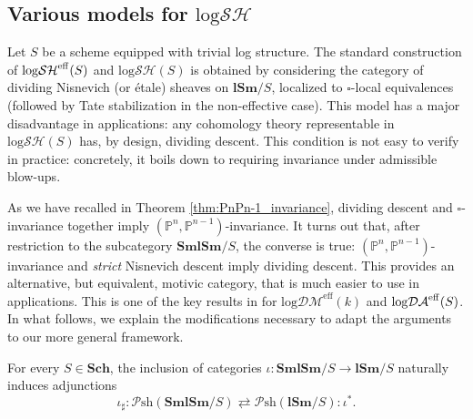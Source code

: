 \documentclass[11pt, a4paper]{amsart}
\theoremstyle{definition}
\numberwithin{equation}{subsection}
\renewcommand{\P}{\mathbb{P}}
\newcommand{\Sch}{\mathbf{Sch}}
\newcommand{\lSm}{\mathbf{lSm}}
\newcommand{\SmlSm}{\mathbf{SmlSm}}
\newcommand{\sharpp}{\sharp}
\newcommand{\boxx}{\square}
\newcommand{\eff}{{\rm eff}}
\newcommand{\infPsh}{\mathcal{P}\mathrm{sh}}
\newcommand{\inflogSH}{\mathrm{log}\mathcal{SH}}
\newcommand{\inflogDA}{\mathrm{log}\mathcal{DA}}
\newcommand{\inflogDMeff}{\mathrm{log}\mathcal{DM}^{\mathrm{eff}}}
\begin{document}
\subsection{Various models for \texorpdfstring{$\inflogSH$}{logSH}}
\label{models}Let $S$ be a scheme equipped with trivial log structure.
The standard construction of $\inflogSH^\eff(S)$ and $\inflogSH(S)$ is obtained by considering the category of dividing Nisnevich (or \'etale) sheaves on $\lSm/S$, localized to $\boxx$-local equivalences (followed by Tate stabilization in the non-effective case). This model has a major disadvantage in applications: any cohomology theory representable in $\inflogSH(S)$ has, by design, dividing descent. This condition is not easy to verify in practice: concretely, it boils down to requiring invariance under admissible blow-ups. 

As we have recalled in Theorem \ref{thm:PnPn-1_invariance}, dividing descent and $\boxx$-invariance together imply $(\P^n, \P^{n-1})$-invariance. It turns out that, after restriction to the subcategory $\SmlSm/S$, the converse is true: $(\P^n, \P^{n-1})$-invariance and \emph{strict} Nisnevich descent imply dividing descent. This provides an alternative, but equivalent, motivic category, that is much easier to use in applications. This is one of the key results in \cite{logDM} for $\inflogDMeff(k)$ and $\inflogDA^\eff(S)$. In what follows, we explain the modifications necessary to adapt the arguments to our more general framework.




For every $S\in \Sch$, 
the inclusion of categories $\iota\colon \SmlSm/S\to \lSm/S$ naturally induces adjunctions
\begin{equation}
\label{logSH.12.1}
\iota_\sharpp : \infPsh(\SmlSm/S) \rightleftarrows \infPsh(\lSm/S): \iota^*.
\end{equation}
\end{document}

